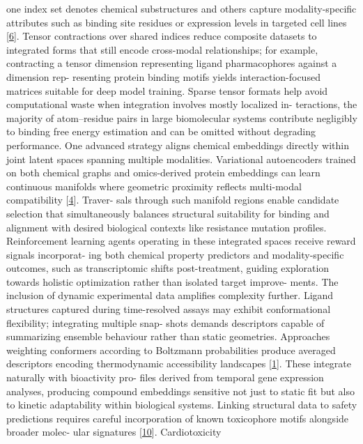 \documentclass[
]{article}
\begin{document}
one index set denotes chemical substructures and others capture
modality-specific attributes such as binding site residues or expression
levels in targeted cell lines {[}\protect\hyperlink{_bookmark46}{6}{]}.
Tensor contractions over shared indices reduce composite datasets to
integrated forms that still encode cross-modal relationships; for
example, contracting a tensor dimension representing ligand
pharmacophores against a dimension rep- resenting protein binding motifs
yields interaction-focused matrices suitable for deep model training.
Sparse tensor formats help avoid computational waste when integration
involves mostly localized in- teractions, the majority of atom--residue
pairs in large biomolecular systems contribute negligibly to binding
free energy estimation and can be omitted without degrading performance.
One advanced strategy aligns chemical embeddings directly within joint
latent spaces spanning multiple modalities. Variational autoencoders
trained on both chemical graphs and omics-derived protein embeddings can
learn continuous manifolds where geometric proximity reflects
multi-modal compatibility {[}\protect\hyperlink{_bookmark44}{4}{]}.
Traver- sals through such manifold regions enable candidate selection
that simultaneously balances structural suitability for binding and
alignment with desired biological contexts like resistance mutation
profiles. Reinforcement learning agents operating in these integrated
spaces receive reward signals incorporat- ing both chemical property
predictors and modality-specific outcomes, such as transcriptomic shifts
post-treatment, guiding exploration towards holistic optimization rather
than isolated target improve- ments. The inclusion of dynamic
experimental data amplifies complexity further. Ligand structures
captured during time-resolved assays may exhibit conformational
flexibility; integrating multiple snap- shots demands descriptors
capable of summarizing ensemble behaviour rather than static geometries.
Approaches weighting conformers according to Boltzmann probabilities
produce averaged descriptors encoding thermodynamic accessibility
landscapes {[}\protect\hyperlink{_bookmark41}{1}{]}. These integrate
naturally with bioactivity pro- files derived from temporal gene
expression analyses, producing compound embeddings sensitive not just to
static fit but also to kinetic adaptability within biological systems.
Linking structural data to safety predictions requires careful
incorporation of known toxicophore motifs alongside broader molec- ular
signatures {[}\protect\hyperlink{_bookmark50}{10}{]}. Cardiotoxicity
\end{document}
